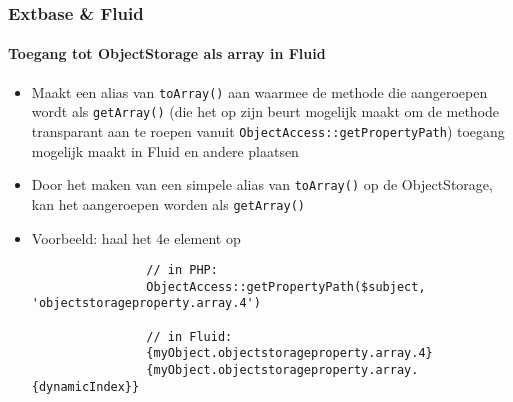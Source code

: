\begin{frame}[fragile]
	\frametitle{Extbase \& Fluid}
	\framesubtitle{Toegang tot ObjectStorage als array in Fluid}

	\lstset{basicstyle=\tiny\ttfamily}

	\begin{itemize}

		\item Maakt een alias van \texttt{toArray()} aan waarmee de methode die aangeroepen
			wordt als \texttt{getArray()} (die het op zijn beurt  mogelijk maakt om de methode
			transparant aan te roepen vanuit \texttt{ObjectAccess::getPropertyPath})
			toegang mogelijk maakt in Fluid en andere plaatsen

		\item Door het maken van een simpele alias van \texttt{toArray()} op de
			ObjectStorage, kan het aangeroepen worden als \texttt{getArray()}

		\item Voorbeeld: haal het 4e element op

			\begin{lstlisting}
				// in PHP:
				ObjectAccess::getPropertyPath($subject, 'objectstorageproperty.array.4')

				// in Fluid:
				{myObject.objectstorageproperty.array.4}
				{myObject.objectstorageproperty.array.{dynamicIndex}}
			\end{lstlisting}

	\end{itemize}

\end{frame}

